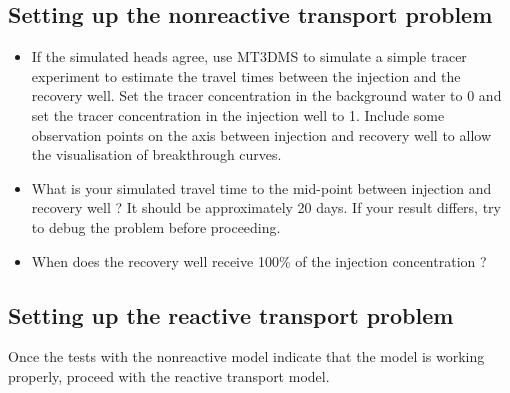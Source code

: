 \subsection[Setting up the nonreactive transport problem]{Setting up the nonreactive transport problem}

\begin{itemize}

\item If the simulated heads agree, use MT3DMS to simulate a simple tracer experiment
to estimate the travel times between the injection and the recovery well. 
Set the tracer concentration in the background water to 0 and set 
the tracer concentration in the injection well to 1. Include some observation 
points on the axis between injection and recovery well to allow the visualisation
of breakthrough curves.

\item What is your simulated travel time to the mid-point between 
injection and recovery well ? It should be approximately 20 days.
If your result differs, try to debug the problem before proceeding.

\item When does the recovery well receive 100\% of the injection concentration ? 

\end{itemize} 

\subsection[Setting up the reactive transport problem]{Setting up the reactive transport problem}

Once the tests with the nonreactive model indicate that the model is working properly,
proceed with the reactive transport model. 

